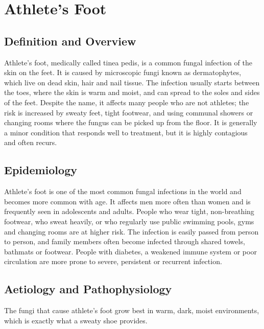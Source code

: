 \chapter{Athlete's Foot}

\section*{Definition and Overview}
Athlete's foot, medically called tinea pedis, is a common fungal infection of the skin on the feet. It is caused by microscopic fungi known as dermatophytes, which live on dead skin, hair and nail tissue. The infection usually starts between the toes, where the skin is warm and moist, and can spread to the soles and sides of the feet. Despite the name, it affects many people who are not athletes; the risk is increased by sweaty feet, tight footwear, and using communal showers or changing rooms where the fungus can be picked up from the floor. It is generally a minor condition that responds well to treatment, but it is highly contagious and often recurs.

\section*{Epidemiology}
Athlete's foot is one of the most common fungal infections in the world and becomes more common with age. It affects men more often than women and is frequently seen in adolescents and adults. People who wear tight, non-breathing footwear, who sweat heavily, or who regularly use public swimming pools, gyms and changing rooms are at higher risk. The infection is easily passed from person to person, and family members often become infected through shared towels, bathmats or footwear. People with diabetes, a weakened immune system or poor circulation are more prone to severe, persistent or recurrent infection.

\section*{Aetiology and Pathophysiology}
The fungi that cause athlete's foot grow best in warm, dark, moist environments, which is exactly what a sweaty shoe provides.

